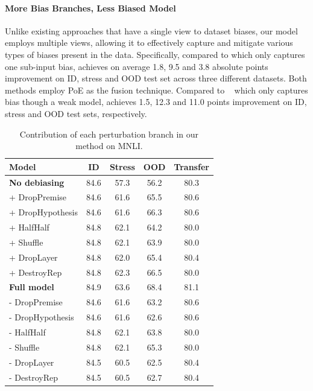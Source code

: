 \paragraph{More Bias Branches, Less Biased Model}
Unlike existing approaches that have a single view to dataset biases, our model employs multiple views, allowing it to effectively capture and mitigate various types of biases present in the data. 
%
Specifically, compared to \ETE which only captures one sub-input bias, \OursPoe achieves on average 1.8, 9.5 and 3.8 absolute points improvement on ID, stress and OOD test set across three different datasets. Both methods employ PoE as the fusion technique. Compared to \MASK~\citep{meissner-etal-2022-debiasing} which only captures bias though a weak model, \OursPoe achieves 1.5, 12.3 and 11.0 points improvement on ID, stress and OOD test sets, respectively. 


\begin{table}
\small
\centering
\begin{tabular}{l|cccc}
    \toprule
    Model & ID & Stress & OOD & Transfer \\ 
    \midrule
    \textbf{No debiasing}      & 84.6 & 57.3 & 56.2 & 80.3 \\
    \midrule
     + DropPremise    & 84.6 & 61.6 & 65.5 & 80.6 \\
     + DropHypothesis & 84.6 & 61.6 & 66.3 & 80.6 \\
     + HalfHalf       & 84.8 & 62.1 & 64.2 & 80.0 \\
     + Shuffle        & 84.8 & 62.1 & 63.9 & 80.0 \\
    \midrule
     + DropLayer      & 84.8 & 62.0 & 65.4 & 80.4 \\
     + DestroyRep     & 84.8 & 62.3 & 66.5 & 80.0 \\
    \midrule
    \midrule
    \textbf{Full model}        & 84.9 & 63.6 & 68.4 & 81.1  \\
    \midrule
     - DropPremise    & 84.6 & 61.6 & 63.2 & 80.6 \\
     - DropHypothesis & 84.6 & 61.6 & 62.6 & 80.6 \\
     - HalfHalf       & 84.8 & 62.1 & 63.8 & 80.0 \\
     - Shuffle        & 84.8 & 62.1 & 65.3 & 80.0 \\
    \midrule
     - DropLayer      & 84.5 & 60.5 & 62.5 & 80.4 \\
     - DestroyRep     & 84.5 & 60.5 & 62.7 & 80.4 \\
    \bottomrule
\end{tabular}
\caption{Contribution of each perturbation branch in our method on MNLI.}
\label{tab:ablation}
\end{table}


